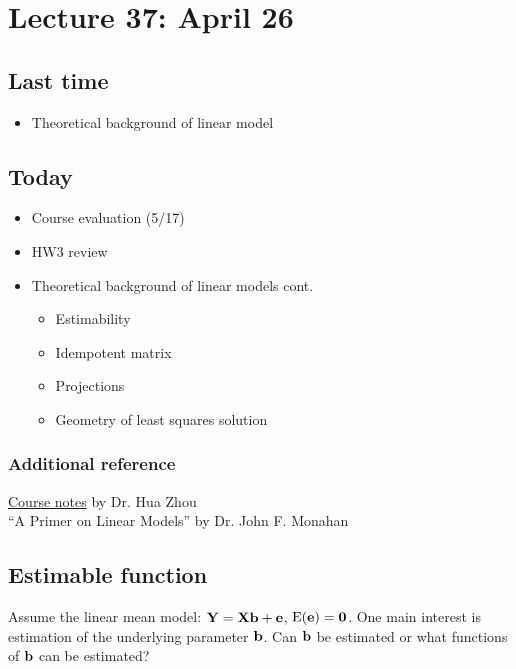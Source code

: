 \setcounter{section}{36}

\section{Lecture 37: April 26}


\subsection*{Last time}
\begin{itemize}
\item Theoretical background of linear model
\end{itemize}


\subsection*{Today}
\begin{itemize}
\item Course evaluation (5/17)
\item HW3 review
\item Theoretical background of linear models cont.
	\begin{itemize}
		\item Estimability
		\item Idempotent matrix
		\item Projections
		\item Geometry of least squares solution
	\end{itemize}
\end{itemize}

\subsubsection*{Additional reference}
\href{http://hua-zhou.github.io/teaching/st552-2013fall/ST552-2013-Fall-LecNotes.pdf}{Course notes} by Dr. Hua Zhou\\
``A Primer on Linear Models'' by Dr. John F. Monahan

\subsection*{Estimable function}
Assume the linear mean model: $\mathbf{Y} = \mathbf{Xb} + \mathbf{e}$, $\mbox{E}(\mathbf{e}) = \mathbf{0}$.
One main interest is estimation of the underlying parameter $\mathbf{b}$.
Can $\mathbf{b}$ be estimated or what functions of $\mathbf{b}$ can be estimated?

